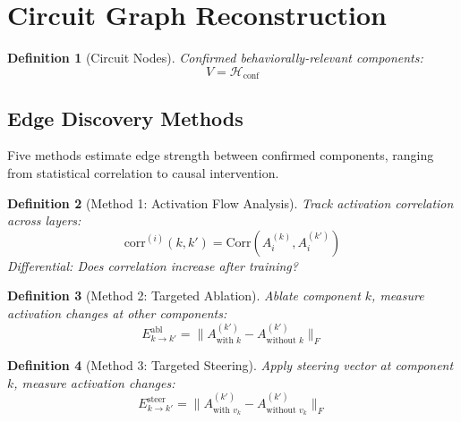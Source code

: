\documentclass[11pt]{article}
\newtheorem{definition}{Definition}[section]
\begin{document}
\section{Circuit Graph Reconstruction}
\label{sec:circuit-graph}

\begin{definition}[Circuit Nodes]
\label{def:circuit-nodes}
Confirmed behaviorally-relevant components:
\begin{equation}
V = \mathcal{H}_{\text{conf}}
\end{equation}
\end{definition}

\subsection{Edge Discovery Methods}
\label{sec:edge-discovery-methods}

Five methods estimate edge strength between confirmed components, ranging from statistical correlation to causal intervention.

\begin{definition}[Method 1: Activation Flow Analysis]
\label{def:edge-activation-flow-analysis}
Track activation correlation across layers:
\begin{equation}
\text{corr}^{(i)}(k, k') = \text{Corr}(A^{(k)}_i, A^{(k')}_i)
\end{equation}
Differential: Does correlation increase after training?
\end{definition}

\begin{definition}[Method 2: Targeted Ablation]
\label{def:edge-targeted-ablation}
Ablate component $k$, measure activation changes at other components:
\begin{equation}
E^{\text{abl}}_{k \to k'} = \|A^{(k')}_{\text{with } k} - A^{(k')}_{\text{without } k}\|_F
\end{equation}
\end{definition}

\begin{definition}[Method 3: Targeted Steering]
\label{def:edge-targeted-steering}
Apply steering vector at component $k$, measure activation changes:
\begin{equation}
E^{\text{steer}}_{k \to k'} = \|A^{(k')}_{\text{with } v_k} - A^{(k')}_{\text{without } v_k}\|_F
\end{equation}
\end{definition}
\end{document}
